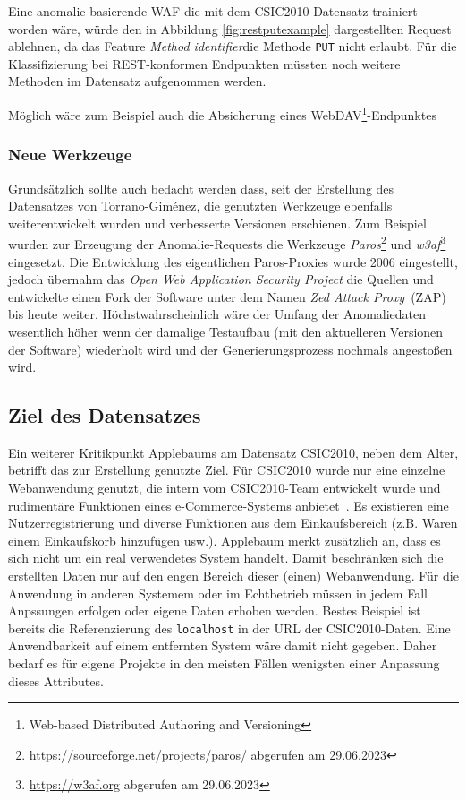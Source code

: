 Eine anomalie-basierende WAF die mit dem CSIC2010-Datensatz trainiert worden wäre, würde den in Abbildung \ref{fig:restputexample} dargestellten Request ablehnen, da das Feature \glqq\emph{Method identifier}\grqq die Methode \verb=PUT= nicht erlaubt. Für die Klassifizierung bei REST-konformen Endpunkten müssten noch weitere Methoden im Datensatz aufgenommen werden.

Möglich wäre zum Beispiel auch die Absicherung eines WebDAV\footnote{Web-based Distributed Authoring and Versioning}-Endpunktes





\subsubsection{Neue Werkzeuge}
\label{sec:neuewerkzeuge}

Grundsätzlich sollte auch bedacht werden dass, seit der Erstellung des Datensatzes von Torrano-Giménez, die genutzten Werkzeuge ebenfalls weiterentwickelt wurden und verbesserte Versionen erschienen. Zum Beispiel wurden zur Erzeugung der Anomalie-Requests die Werkzeuge \emph{Paros}\footnote{\url{https://sourceforge.net/projects/paros/} abgerufen am 29.06.2023} und \emph{w3af}\footnote{\url{https://w3af.org} abgerufen am 29.06.2023} eingesetzt. Die Entwicklung des eigentlichen Paros-Proxies wurde 2006 eingestellt, jedoch übernahm das \emph{Open Web Application Security Project} die Quellen und entwickelte einen Fork der Software unter dem Namen \emph{Zed Attack Proxy}~(ZAP) bis heute weiter. Höchstwahrscheinlich wäre der Umfang der Anomaliedaten wesentlich höher wenn der damalige Testaufbau (mit den aktuelleren Versionen der Software) wiederholt wird und der Generierungsprozess nochmals angestoßen wird.
  
\subsection{Ziel des Datensatzes}
\label{sec:zieldesdatensatzes}

Ein weiterer Kritikpunkt Applebaums am Datensatz CSIC2010, neben dem Alter, betrifft das zur Erstellung genutzte Ziel. Für CSIC2010 wurde nur eine einzelne Webanwendung genutzt, die intern vom CSIC2010-Team entwickelt wurde und rudimentäre Funktionen eines e-Commerce-Systems anbietet~\cite{csic2010}. Es existieren eine Nutzerregistrierung und diverse Funktionen aus dem Einkaufsbereich (z.B. Waren einem Einkaufskorb hinzufügen usw.). Applebaum merkt zusätzlich an, dass es sich nicht um ein real verwendetes System handelt. Damit beschränken sich die erstellten Daten nur auf den engen Bereich dieser (einen) Webanwendung. Für die Anwendung in anderen Systemem oder im Echtbetrieb müssen in jedem Fall Anpssungen erfolgen oder eigene Daten erhoben werden. Bestes Beispiel ist bereits die Referenzierung des \verb=localhost= in der URL der CSIC2010-Daten. Eine Anwendbarkeit auf einem entfernten System wäre damit nicht gegeben. Daher bedarf es für eigene Projekte in den meisten Fällen wenigsten einer Anpassung dieses Attributes. 

